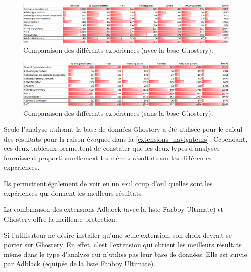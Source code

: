 \begin{figure}[!h]
	\hspace{-2cm}
	\includegraphics[scale=.54]{resultats/ANALYSES/Images/Comparaisons-Ghostery.png}
	\caption{\label{comparaisons-ghostery}Comparaison des différents expériences (avec la base Ghostery).}
\end{figure}

\begin{figure}[!h]
	\hspace{-2cm}
	\includegraphics[scale=.6]{resultats/ANALYSES/Images/Comparaisons-NoG.png}
	\caption{\label{comparaisons-nog}Comparaison des différents expériences (sans la base Ghostery).}
\end{figure}

Seule l'analyse utilisant la base de données Ghostery a été utilisée pour le calcul des résultats pour la raison évoquée dans la \autoref{extensions_navigateurs}. Cependant, ces deux tableaux permettent de constater que les deux types d'analyses fournissent proportionnellement les mêmes résultats sur les différentes expériences.
\newline

Ils permettent également de voir en un seul coup d'\oe{}il quelles sont les expériences qui donnent les meilleurs résultats.

La combinaison des extensions Adblock (avec la liste Fanboy Ultimate) et Ghostery offre la meilleure protection.

Si l'utilisateur ne désire installer qu'une seule extension, son choix devrait se porter sur Ghostery.
En effet, c'est l'extension qui obtient les meilleurs résultats même dans le type d'analyse qui n'utilise pas leur base de données. Elle est suivie par Adblock (équipée de la liste Fanboy Ultimate).

